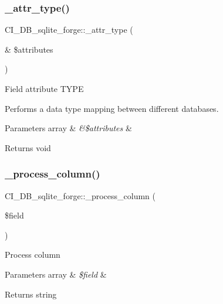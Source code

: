 \subsubsection{\texorpdfstring{\+\_\+attr\+\_\+type()}{\_attr\_type()}}
{\footnotesize\ttfamily C\+I\+\_\+\+D\+B\+\_\+sqlite\+\_\+forge\+::\+\_\+attr\+\_\+type (\begin{DoxyParamCaption}\item[{\&}]{\$attributes }\end{DoxyParamCaption})\hspace{0.3cm}{\ttfamily [protected]}}

Field attribute T\+Y\+PE

Performs a data type mapping between different databases.


\begin{DoxyParams}[1]{Parameters}
array & {\em \&\$attributes} & \\
\hline
\end{DoxyParams}
\begin{DoxyReturn}{Returns}
void 
\end{DoxyReturn}
\mbox{\label{class_c_i___d_b__sqlite__forge_a9ec74d1673dbed86f95be560e5d29e96}} 
\subsubsection{\texorpdfstring{\+\_\+process\+\_\+column()}{\_process\_column()}}
{\footnotesize\ttfamily C\+I\+\_\+\+D\+B\+\_\+sqlite\+\_\+forge\+::\+\_\+process\+\_\+column (\begin{DoxyParamCaption}\item[{}]{\$field }\end{DoxyParamCaption})\hspace{0.3cm}{\ttfamily [protected]}}

Process column


\begin{DoxyParams}[1]{Parameters}
array & {\em \$field} & \\
\hline
\end{DoxyParams}
\begin{DoxyReturn}{Returns}
string 
\end{DoxyReturn}
\mbox{\label{class_c_i___d_b__sqlite__forge_a167b7e739a45c9620df00e339ef5a559}} 

